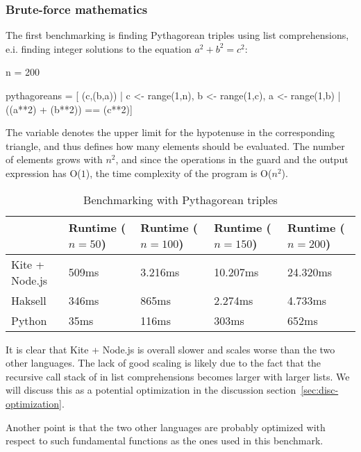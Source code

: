 \subsubsection{Brute-force mathematics}
\label{sec:math-benchmark}
The first benchmarking is finding Pythagorean triples using list comprehensions, e.i. finding integer solutions to the equation $a^2 + b^2 = c^2$:

\begin{kite}
  n = 200

  pythagoreans = [ (c,(b,a)) | c <- range(1,n), b <- range(1,c),
        a <- range(1,b) | ((a**2) + (b**2)) == (c**2)]
\end{kite}

The variable  denotes the upper limit for the hypotenuse in the corresponding triangle, and thus defines how many elements should be evaluated. The number of elements grows with $n^2$, and since the operations in the guard and the output expression has O($1$), the time complexity of the program is O($n^2$).

\begin{table}[h]
  \centering
  \begin{tabular}{|l|l|l|l|l|}
    \hline
                   & Runtime ($n = 50$) & Runtime ($n = 100$) & Runtime ($n = 150$) & Runtime ($n = 200$) \\
    \hline
    Kite + Node.js & 509ms              & 3.216ms             & 10.207ms            & 24.320ms            \\
    Haksell        & 346ms              & 865ms               & 2.274ms             & 4.733ms             \\
    Python         & 35ms               & 116ms               & 303ms               & 652ms               \\
    \hline
  \end{tabular}
  \caption{Benchmarking with Pythagorean triples}
\end{table}

It is clear that Kite + Node.js is overall slower and scales worse than the two other languages. The lack of good scaling is likely due to the fact that the recursive call stack of  in list comprehensions becomes larger with larger lists. We will discuss this as a potential optimization in the discussion section~\ref{sec:disc-optimization}.

Another point is that the two other languages are probably optimized with respect to such fundamental functions as the ones used in this benchmark.

